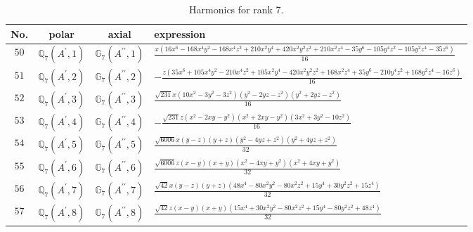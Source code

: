 \documentclass[fleqn,8pt,landscape]{jsarticle}
\begin{document}
\begin{table}[ht!]
\begin{center}
\caption{Harmonics for rank 7.}
\renewcommand{\arraystretch}{1.3}
\begin{tabular}{cccl} \hline \hline
No. & polar & axial & expression \\ \hline
$ 50 $ & $ \mathbb{Q}_{7}(A^{\prime},1) $ & $ \mathbb{G}_{7}(A^{\prime\prime},1) $ & $ \frac{x \left(16 x^{6} - 168 x^{4} y^{2} - 168 x^{4} z^{2} + 210 x^{2} y^{4} + 420 x^{2} y^{2} z^{2} + 210 x^{2} z^{4} - 35 y^{6} - 105 y^{4} z^{2} - 105 y^{2} z^{4} - 35 z^{6}\right)}{16} $ \\
$ 51 $ & $ \mathbb{Q}_{7}(A^{\prime},2) $ & $ \mathbb{G}_{7}(A^{\prime\prime},2) $ & $ - \frac{z \left(35 x^{6} + 105 x^{4} y^{2} - 210 x^{4} z^{2} + 105 x^{2} y^{4} - 420 x^{2} y^{2} z^{2} + 168 x^{2} z^{4} + 35 y^{6} - 210 y^{4} z^{2} + 168 y^{2} z^{4} - 16 z^{6}\right)}{16} $ \\
$ 52 $ & $ \mathbb{Q}_{7}(A^{\prime},3) $ & $ \mathbb{G}_{7}(A^{\prime\prime},3) $ & $ \frac{\sqrt{231} x \left(10 x^{2} - 3 y^{2} - 3 z^{2}\right) \left(y^{2} - 2 y z - z^{2}\right) \left(y^{2} + 2 y z - z^{2}\right)}{16} $ \\
$ 53 $ & $ \mathbb{Q}_{7}(A^{\prime},4) $ & $ \mathbb{G}_{7}(A^{\prime\prime},4) $ & $ - \frac{\sqrt{231} z \left(x^{2} - 2 x y - y^{2}\right) \left(x^{2} + 2 x y - y^{2}\right) \left(3 x^{2} + 3 y^{2} - 10 z^{2}\right)}{16} $ \\
$ 54 $ & $ \mathbb{Q}_{7}(A^{\prime},5) $ & $ \mathbb{G}_{7}(A^{\prime\prime},5) $ & $ \frac{\sqrt{6006} x \left(y - z\right) \left(y + z\right) \left(y^{2} - 4 y z + z^{2}\right) \left(y^{2} + 4 y z + z^{2}\right)}{32} $ \\
$ 55 $ & $ \mathbb{Q}_{7}(A^{\prime},6) $ & $ \mathbb{G}_{7}(A^{\prime\prime},6) $ & $ \frac{\sqrt{6006} z \left(x - y\right) \left(x + y\right) \left(x^{2} - 4 x y + y^{2}\right) \left(x^{2} + 4 x y + y^{2}\right)}{32} $ \\
$ 56 $ & $ \mathbb{Q}_{7}(A^{\prime},7) $ & $ \mathbb{G}_{7}(A^{\prime\prime},7) $ & $ \frac{\sqrt{42} x \left(y - z\right) \left(y + z\right) \left(48 x^{4} - 80 x^{2} y^{2} - 80 x^{2} z^{2} + 15 y^{4} + 30 y^{2} z^{2} + 15 z^{4}\right)}{32} $ \\
$ 57 $ & $ \mathbb{Q}_{7}(A^{\prime},8) $ & $ \mathbb{G}_{7}(A^{\prime\prime},8) $ & $ \frac{\sqrt{42} z \left(x - y\right) \left(x + y\right) \left(15 x^{4} + 30 x^{2} y^{2} - 80 x^{2} z^{2} + 15 y^{4} - 80 y^{2} z^{2} + 48 z^{4}\right)}{32} $ \\

\end{tabular}
\end{center}
\end{table}
\end{document}
